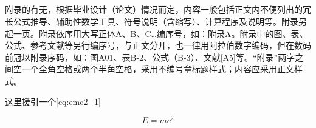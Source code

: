 \newpage
\begin{appendix}

\renewcommand{\thechapter}{\Alph{chapter}}
\setcounter{figure}{0}
\setcounter{table}{0}
\setcounter{equation}{0}
\renewcommand{\thefigure}{\thechapter-\arabic{figure}}
\renewcommand{\thetable}{\thechapter-\arabic{table}}
\renewcommand{\theequation}{\thechapter-\arabic{equation}}

\chapter{}
附录的有无，根据毕业设计（论文）情况而定，内容一般包括正文内不便列出的冗长公式推导、辅助性数学工具、符号说明（含缩写）、计算程序及说明等。附录另起一页。附录依序用大写正体A、B、C…编序号，如：附录A。附录中的图、表、公式、参考文献等另行编序号，与正文分开，也一律用阿拉伯数字编码，但在数码前冠以附录序码，如：图A01、表B-2、公式（B-3）、文献[A5]等。“附录”两字之间空一个全角空格或两个半角空格，采用不编号章标题样式；内容应采用正文样式。

这里援引一个\cref{eq:emc2_1}

\begin{equation}
  E = mc^2
  \label{eq:emc2_1}
\end{equation}

\end{appendix}